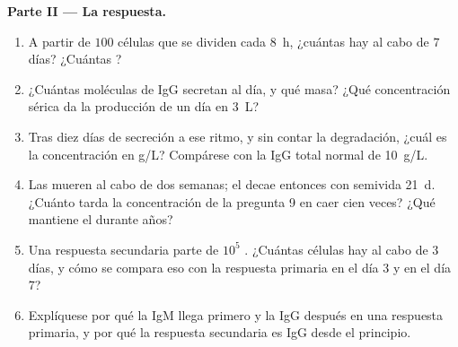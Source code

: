 \begin{problem}
\medskip
\noindent\textbf{Parte II --- La respuesta.}
\begin{enumerate}[resume]
  \item A partir de $100$ células que se dividen cada \qty{8}{h},
        ¿cuántas hay al cabo de $7$ días? ¿Cuántas ?
  \item ¿Cuántas moléculas de IgG secretan al día, y qué masa? ¿Qué
        concentración sérica da la producción de un día en \qty{3}{L}?
  \item Tras diez días de secreción a ese ritmo, y sin contar la
        degradación, ¿cuál es la concentración en g/L? Compárese con la
        IgG total normal de \qty{10}{g/L}.
  \item Las  mueren al cabo de dos semanas; el
         decae entonces con semivida \qty{21}{d}. ¿Cuánto tarda
        la concentración de la pregunta 9 en caer cien veces? ¿Qué
        mantiene el  durante años?
  \item Una respuesta secundaria parte de $10^{5}$ .
        ¿Cuántas células hay al cabo de $3$ días, y cómo se compara eso
        con la respuesta primaria en el día 3 y en el día 7?
  \item Explíquese por qué la IgM llega primero y la IgG después en una
        respuesta primaria, y por qué la respuesta secundaria es IgG
        desde el principio.
\end{enumerate}


\end{problem}
